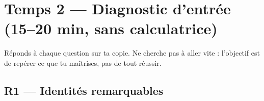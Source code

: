
\section*{Temps 2 — Diagnostic d'entrée \hfill
\normalfont\small(15–20 min, sans calculatrice)}

Réponds à chaque question sur ta copie. Ne cherche pas à aller vite : l'objectif est de repérer ce que tu maîtrises, pas de tout réussir.

\bigskip

\subsection*{R1 — Identités remarquables}

